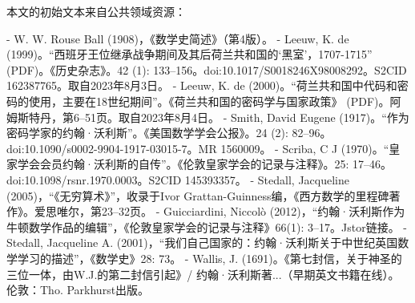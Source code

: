 本文的初始文本来自公共领域资源：

- W. W. Rouse Ball (1908)，《数学史简述》（第4版）。
- Leeuw, K. de (1999)。“西班牙王位继承战争期间及其后荷兰共和国的‘黑室’，1707-1715” (PDF)。《历史杂志》。42 (1): 133–156。doi:10.1017/S0018246X98008292。S2CID 162387765。取自2023年8月3日。
- Leeuw, K. de (2000)。“荷兰共和国中代码和密码的使用，主要在18世纪期间”。《荷兰共和国的密码学与国家政策》 (PDF)。阿姆斯特丹，第6–51页。取自2023年8月4日。
- Smith, David Eugene (1917)。“作为密码学家的约翰·沃利斯”。《美国数学学会公报》。24 (2): 82–96。doi:10.1090/s0002-9904-1917-03015-7。MR 1560009。
- Scriba, C J (1970)。“皇家学会会员约翰·沃利斯的自传”。《伦敦皇家学会的记录与注释》。25: 17–46。doi:10.1098/rsnr.1970.0003。S2CID 145393357。
- Stedall, Jacqueline (2005)，“《无穷算术》”，收录于Ivor Grattan-Guinness编，《西方数学的里程碑著作》。爱思唯尔，第23–32页。
- Guicciardini, Niccolò (2012)，“约翰·沃利斯作为牛顿数学作品的编辑”，《伦敦皇家学会的记录与注释》66(1): 3–17。Jstor链接。
- Stedall, Jacqueline A. (2001)，“我们自己国家的：约翰·沃利斯关于中世纪英国数学学习的描述”，《数学史》28: 73。
- Wallis, J. (1691)。《第七封信，关于神圣的三位一体，由W.J.的第二封信引起》/ 约翰·沃利斯著...（早期英文书籍在线）。伦敦：Tho. Parkhurst出版。